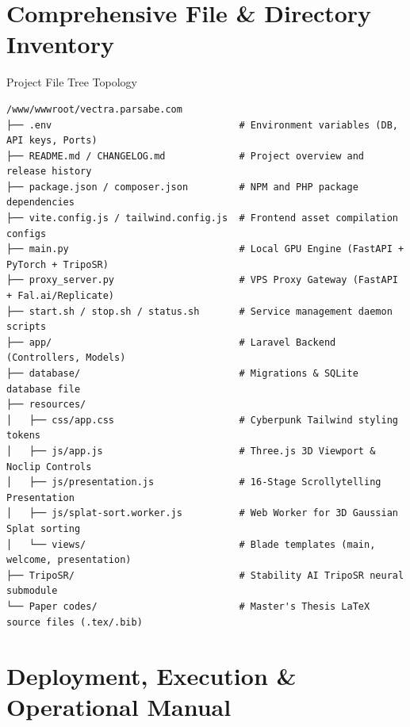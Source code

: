 \documentclass[11pt, a4paper]{article}
\begin{document}
\section{Comprehensive File \& Directory Inventory}

\begin{codecard}{Project File Tree Topology}
\begin{verbatim}
/www/wwwroot/vectra.parsabe.com
├── .env                                 # Environment variables (DB, API keys, Ports)
├── README.md / CHANGELOG.md             # Project overview and release history
├── package.json / composer.json         # NPM and PHP package dependencies
├── vite.config.js / tailwind.config.js  # Frontend asset compilation configs
├── main.py                              # Local GPU Engine (FastAPI + PyTorch + TripoSR)
├── proxy_server.py                      # VPS Proxy Gateway (FastAPI + Fal.ai/Replicate)
├── start.sh / stop.sh / status.sh       # Service management daemon scripts
├── app/                                 # Laravel Backend (Controllers, Models)
├── database/                            # Migrations & SQLite database file
├── resources/
│   ├── css/app.css                      # Cyberpunk Tailwind styling tokens
│   ├── js/app.js                        # Three.js 3D Viewport & Noclip Controls
│   ├── js/presentation.js               # 16-Stage Scrollytelling Presentation
│   ├── js/splat-sort.worker.js          # Web Worker for 3D Gaussian Splat sorting
│   └── views/                           # Blade templates (main, welcome, presentation)
├── TripoSR/                             # Stability AI TripoSR neural submodule
└── Paper codes/                         # Master's Thesis LaTeX source files (.tex/.bib)
\end{verbatim}
\end{codecard}


\section{Deployment, Execution \& Operational Manual}
\end{document}
